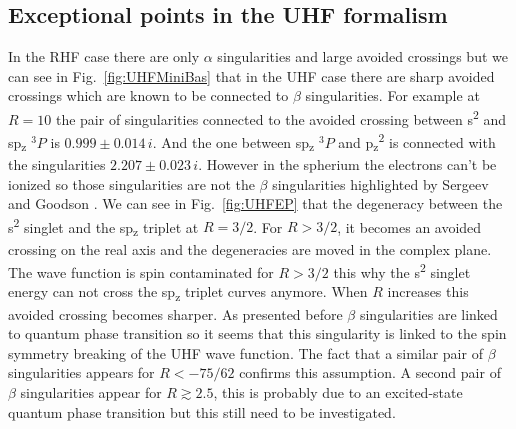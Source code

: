 \documentclass[11pt,a4paper]{article}
\begin{document}
\subsection{Exceptional points in the UHF formalism}\label{sec:uhfSing}

In the RHF case there are only $\alpha$ singularities and large avoided crossings but we can see in Fig.~\ref{fig:UHFMiniBas} that in the UHF case there are sharp avoided crossings which are known to be connected to $\beta$ singularities. For example at $R=10$ the pair of singularities connected to the avoided crossing between s\textsuperscript{2} and sp\textsubscript{z} $^{3}P$ is $0.999\pm0.014\,i$. And the one between sp\textsubscript{z} $^{3}P$ and p\textsubscript{z}\textsuperscript{2} is connected with the singularities $2.207\pm0.023\,i$. However in the spherium the electrons can't be ionized so those singularities are not the $\beta$ singularities highlighted by Sergeev and Goodson \cite{Sergeev_2005}. We can see in Fig.~\ref{fig:UHFEP} that the degeneracy between the s\textsuperscript{2} singlet and the sp\textsubscript{z} triplet at $R=3/2$. For $R>3/2$, it becomes an avoided crossing on the real axis and the degeneracies are moved in the complex plane. The wave function is spin contaminated for $R>3/2$ this why the s\textsuperscript{2} singlet energy can not cross the sp\textsubscript{z} triplet curves anymore. When $R$ increases this avoided crossing becomes sharper. As presented before $\beta$ singularities are linked to quantum phase transition so it seems that this singularity is linked to the spin symmetry breaking of the UHF wave function. The fact that a similar pair of $\beta$ singularities appears for $R<-75/62$ confirms this assumption. A second pair of $\beta$ singularities appear for $R\gtrsim 2.5$, this is probably due to an excited-state quantum phase transition but this still need to be investigated. 
\end{document}
